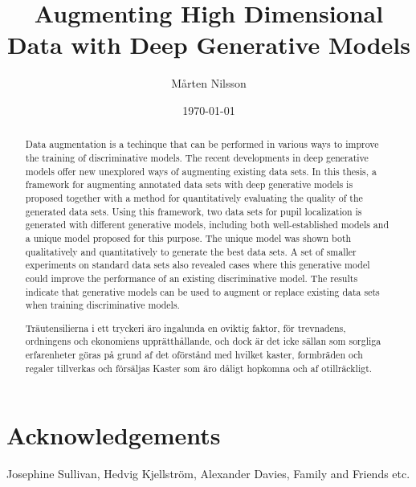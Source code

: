 \documentclass{kththesis}
\title{Augmenting High Dimensional Data with Deep Generative Models}
\author{Mårten Nilsson}
\date{\today}
\begin{document}
\frontmatter

\titlepage

\begin{abstract}
Data augmentation is a techinque that can be performed in various ways to improve the training of discriminative models. The recent developments in deep generative models offer new unexplored ways of augmenting existing data sets. In this thesis, a framework for augmenting annotated data sets with deep generative models is proposed together with a method for quantitatively evaluating the quality of the generated data sets. Using this framework, two data sets for pupil localization is generated with different generative models, including both well-established models and a unique model proposed for this purpose. The unique model was shown both qualitatively and quantitatively to generate the best data sets. A set of smaller experiments on standard data sets also revealed cases where this generative model could improve the performance of an existing discriminative model. The results indicate that generative models can be used to augment or replace existing data sets when training discriminative models.
\end{abstract}


\begin{otherlanguage}{swedish}
  \begin{abstract}
    Träutensilierna i ett tryckeri äro ingalunda en oviktig faktor,
    för trevnadens, ordningens och ekonomiens upprätthållande, och
    dock är det icke sällan som sorgliga erfarenheter göras på grund
    af det oförstånd med hvilket kaster, formbräden och regaler
    tillverkas och försäljas Kaster som äro dåligt hopkomna och af
    otillräckligt.
  \end{abstract}
\end{otherlanguage}

\section*{Acknowledgements}
Josephine Sullivan, Hedvig Kjellström, Alexander Davies, Family and Friends etc. 

\tableofcontents


\mainmatter

\end{document}
